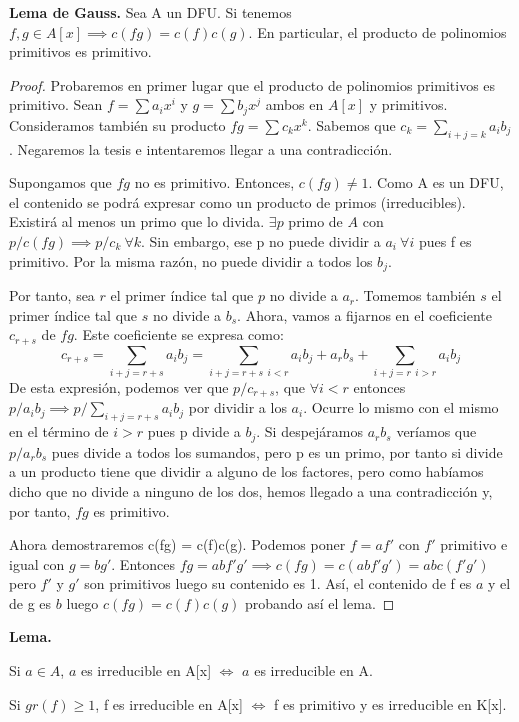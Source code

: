 \textbf{Lema de Gauss.} Sea A un DFU. Si tenemos $f,g \in A[x]\implies c(fg) = c(f)c(g)$. En particular, el producto de polinomios primitivos es primitivo.\\
\begin{proof}
	Probaremos en primer lugar que el producto de polinomios primitivos es primitivo. Sean $f= \sum a_i x^i $ y $g= \sum b_j x^j$ ambos en $A[x]$ y primitivos. Consideramos también su producto $fg = \sum c_k x^k$. Sabemos que  $c_k = \sum_{i+j=k}a_ib_j$. Negaremos la tesis e intentaremos llegar a una contradicción.

	Supongamos que $fg$ no es primitivo. Entonces, $c(fg) \ne 1$. Como A es un DFU, el contenido se podrá expresar como un producto de primos (irreducibles). Existirá al menos un primo que lo divida. $\exists p $ primo de $A$ con $p/c(fg) \implies p/c_k \ \forall k$. Sin embargo, ese p no puede dividir a $a_i \ \forall i$ pues f es primitivo. Por la misma razón, no puede dividir a todos los $b_j$.

	Por tanto, sea $r$ el primer índice tal que $p$ no divide a $a_r$. Tomemos también $s$ el primer índice tal que $s$ no divide a $b_s$. Ahora, vamos a fijarnos en el coeficiente $c_{r+s}$ de $fg$. Este coeficiente se expresa como:
	 \[c_{r+s} = \sum _{i+j=r+s}a_ib_j = \sum _{i+j =r+s \ \ i < r}a_ib_j + a_rb_s + \sum_{i+j=r \ \ i > r}a_ib_j\]
	 De esta expresión, podemos ver que $p/c_{r+s}$, que $\forall i < r$ entonces $p/a_ib_j \implies p/\sum_{i+j =r+s}a_ib_j$ por dividir a los $a_i$. Ocurre lo mismo con el mismo en el término de $i > r $ pues p divide a $b_j$. Si despejáramos $a_rb_s$ veríamos que $p/a_rb_s$ pues divide a todos los sumandos, pero p es un primo, por tanto si divide a un producto tiene que dividir a alguno de los factores, pero como habíamos dicho que no divide a ninguno de los dos, hemos llegado a una contradicción y, por tanto, $fg$ es primitivo.

	 Ahora demostraremos c(fg) = c(f)c(g). Podemos poner $f=af'$ con $f'$ primitivo e igual con $g=bg'$. Entonces $fg= abf'g'\implies c(fg)=c(abf'g') = abc(f'g')$ pero $f'$ y $g'$ son primitivos luego su contenido es 1. Así, el contenido de f es $a$ y el de g es $b$ luego $c(fg) = c(f)c(g)$ probando así el lema.
\end{proof}
\newpage
\textbf{Lema.}
\begin{nlist}
	\item Si $a \in A$, $a$ es irreducible en A[x] $\Leftrightarrow$ $a$ es irreducible en A.
	\item Si $gr(f) \geq 1$, f es irreducible en A[x] $\Leftrightarrow$ f es primitivo y es irreducible en K[x].
 \end{nlist}

